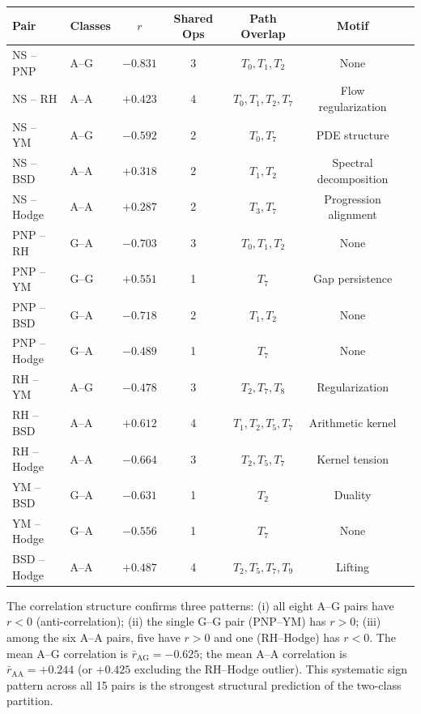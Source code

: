 \documentclass[11pt]{article}
\begin{document}
\begin{center}
\small
\begin{tabular}{@{}llccccl@{}}
\toprule
\textbf{Pair} & \textbf{Classes} & $r$ & \textbf{Shared Ops} & \textbf{Path Overlap} & \textbf{Motif} \\
\midrule
NS -- PNP   & A--G & $-0.831$ & 3 & $T_0,T_1,T_2$ & None \\
NS -- RH    & A--A & $+0.423$ & 4 & $T_0,T_1,T_2,T_7$ & Flow regularization \\
NS -- YM    & A--G & $-0.592$ & 2 & $T_0,T_7$ & PDE structure \\
NS -- BSD   & A--A & $+0.318$ & 2 & $T_1,T_2$ & Spectral decomposition \\
NS -- Hodge & A--A & $+0.287$ & 2 & $T_3,T_7$ & Progression alignment \\
PNP -- RH   & G--A & $-0.703$ & 3 & $T_0,T_1,T_2$ & None \\
PNP -- YM   & G--G & $+0.551$ & 1 & $T_7$ & Gap persistence \\
PNP -- BSD  & G--A & $-0.718$ & 2 & $T_1,T_2$ & None \\
PNP -- Hodge& G--A & $-0.489$ & 1 & $T_7$ & None \\
RH -- YM    & A--G & $-0.478$ & 3 & $T_2,T_7,T_8$ & Regularization \\
RH -- BSD   & A--A & $+0.612$ & 4 & $T_1,T_2,T_5,T_7$ & Arithmetic kernel \\
RH -- Hodge & A--A & $-0.664$ & 3 & $T_2,T_5,T_7$ & Kernel tension \\
YM -- BSD   & G--A & $-0.631$ & 1 & $T_2$ & Duality \\
YM -- Hodge & G--A & $-0.556$ & 1 & $T_7$ & None \\
BSD -- Hodge& A--A & $+0.487$ & 4 & $T_2,T_5,T_7,T_9$ & Lifting \\
\bottomrule
\end{tabular}
\end{center}

\noindent
The correlation structure confirms three patterns: (i) all eight
A--G pairs have $r < 0$ (anti-correlation); (ii) the single G--G pair
(PNP--YM) has $r > 0$; (iii) among the six A--A pairs, five have
$r > 0$ and one (RH--Hodge) has $r < 0$.  The mean A--G correlation
is $\bar{r}_{\mathrm{AG}} = -0.625$; the mean A--A correlation is
$\bar{r}_{\mathrm{AA}} = +0.244$ (or $+0.425$ excluding the
RH--Hodge outlier).  This systematic sign pattern across all 15 pairs
is the strongest structural prediction of the two-class partition.
\end{document}
